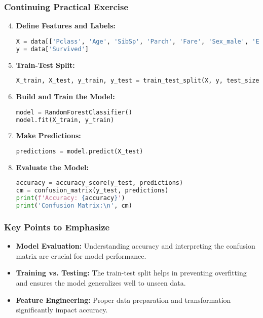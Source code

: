 \documentclass[aspectratio=169]{beamer}
\begin{document}
\begin{frame}[fragile]
    \frametitle{Continuing Practical Exercise}
    \begin{enumerate}
        \setcounter{enumi}{3}
        \item \textbf{Define Features and Labels:}
        \begin{lstlisting}[language=Python]
X = data[['Pclass', 'Age', 'SibSp', 'Parch', 'Fare', 'Sex_male', 'Embarked_Q', 'Embarked_S']]
y = data['Survived']
        \end{lstlisting}

        \item \textbf{Train-Test Split:}
        \begin{lstlisting}[language=Python]
X_train, X_test, y_train, y_test = train_test_split(X, y, test_size=0.2, random_state=42)
        \end{lstlisting}
        
        \item \textbf{Build and Train the Model:}
        \begin{lstlisting}[language=Python]
model = RandomForestClassifier()
model.fit(X_train, y_train)
        \end{lstlisting}
        
        \item \textbf{Make Predictions:}
        \begin{lstlisting}[language=Python]
predictions = model.predict(X_test)
        \end{lstlisting}
        
        \item \textbf{Evaluate the Model:}
        \begin{lstlisting}[language=Python]
accuracy = accuracy_score(y_test, predictions)
cm = confusion_matrix(y_test, predictions)
print(f'Accuracy: {accuracy}')
print('Confusion Matrix:\n', cm)
        \end{lstlisting}
    \end{enumerate}
\end{frame}

\begin{frame}
    \frametitle{Key Points to Emphasize}
    \begin{itemize}
        \item \textbf{Model Evaluation:} 
        Understanding accuracy and interpreting the confusion matrix are crucial for model performance.
        
        \item \textbf{Training vs. Testing:}
        The train-test split helps in preventing overfitting and ensures the model generalizes well to unseen data.
        
        \item \textbf{Feature Engineering:}
        Proper data preparation and transformation significantly impact accuracy.
    \end{itemize}
\end{frame}
\end{document}
